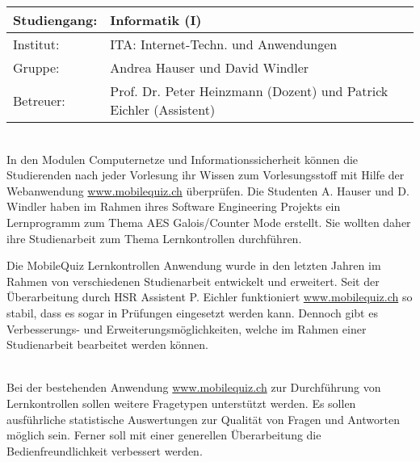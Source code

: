 
\noindent
{\renewcommand{\arraystretch}{1.5}
\begin{tabular}{l l}
	Studiengang: & Informatik (I) \\ 
	\hline
	Institut: & ITA: Internet-Techn. und Anwendungen \\ 
	Gruppe: & Andrea Hauser und David Windler \\ 
	\hline 
	Betreuer: & Prof. Dr. Peter Heinzmann (Dozent) und Patrick Eichler (Assistent)
\end{tabular} 
}

\bigskip\bigskip
{}\\

In den Modulen Computernetze und Informationssicherheit können die Studierenden nach jeder Vorlesung ihr Wissen zum Vorlesungsstoff mit Hilfe der Webanwendung \url{www.mobilequiz.ch}  überprüfen. Die Studenten A. Hauser und D. Windler haben im Rahmen ihres Software Engineering Projekts ein Lernprogramm zum Thema AES Galois/Counter Mode erstellt. Sie wollten daher ihre Studienarbeit zum Thema Lernkontrollen durchführen.

Die MobileQuiz Lernkontrollen Anwendung wurde in den letzten Jahren im Rahmen von verschiedenen Studienarbeit entwickelt und erweitert. Seit der Überarbeitung durch HSR Assistent P. Eichler funktioniert \url{www.mobilequiz.ch} so stabil, dass es sogar in Prüfungen eingesetzt werden kann.  Dennoch gibt es Verbesserungs- und Erweiterungsmöglichkeiten, welche im Rahmen einer Studienarbeit bearbeitet werden können.

\bigskip\bigskip
{}\\

Bei der bestehenden Anwendung \url{www.mobilequiz.ch} zur Durchführung von Lernkontrollen sollen weitere Fragetypen unterstützt werden. Es sollen ausführliche statistische Auswertungen zur Qualität von Fragen und Antworten möglich sein. Ferner soll mit einer generellen Überarbeitung die Bedienfreundlichkeit verbessert werden.

\bigskip\bigskip
{}

